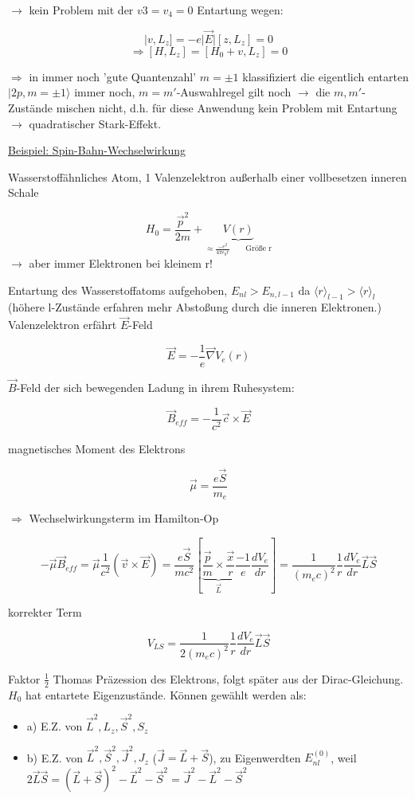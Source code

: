 \(\rightarrow\) kein Problem mit der \(v3=v_4=0\) Entartung wegen:

\[ |v,L_z] = -e|\vec E| [z,L_z] = 0\]
\[\Rightarrow [H,L_z] = [H_0+v,L_z]=0\]

\(\Rightarrow\) in immer noch 'gute Quantenzahl' \(m=\pm 1\) klassifiziert die eigentlich entarten \(|2p,m=\pm 1\rangle\) immer noch, \(m=m'\)-Auswahlregel gilt noch \(\rightarrow\) die \(m,m'\)-Zustände mischen nicht, d.h. für diese Anwendung kein Problem mit Entartung \(\rightarrow\) quadratischer Stark-Effekt.

\underline{Beispiel: Spin-Bahn-Wechselwirkung}

Wasserstoffähnliches Atom, 1 Valenzelektron außerhalb einer vollbesetzen inneren Schale

\[ H_0= \frac{\vec p^2}{2m} + \underbrace{V(r)}_{\approx \frac{-e^2}{4\pi \epsilon_0 r}\qquad\text{Größe r}}\]
\(\rightarrow\) aber immer Elektronen bei kleinem r!

Entartung des Wasserstoffatoms aufgehoben, \(E_{nl}>E_{n,l-1}\) da \(\langle r \rangle_{l-1}> \langle r \rangle_l\) (höhere l-Zustände erfahren mehr Abstoßung durch die inneren Elektronen.) Valenzelektron erfährt \(\vec E\)-Feld

\[ \vec E = -\frac{1}{e}\vec \nabla V_e(r)\]

\(\vec B\)-Feld der sich bewegenden Ladung in ihrem Ruhesystem:

\[ \vec B_{eff} = -\frac{1}{c^2}\vec c\times \vec E\]

magnetisches Moment des Elektrons

\[ \vec\mu = \frac{e \vec S}{m_e}\]

\(\Rightarrow\) Wechselwirkungsterm im Hamilton-Op

\[ -\vec \mu \vec B_{eff} = \vec \mu \frac{1}{c^2}(\vec v \times \vec E) = \frac{e\vec S}{m c^2}\left[\underbrace{ \frac{\vec p}{m}\times \frac{\vec x}{r}}_{\vec L}\frac{-1}{e}\frac{dV_e}{dr} \right]=\frac{1}{(m_ec)^2}\frac{1}{r}\frac{dV_e}{dr}\vec L \vec S\]

korrekter Term

\[ V_{LS}=\frac{1}{2(m_ec)^2}\frac{1}{r}\frac{dV_e}{dr}\vec L \vec S\]

Faktor \(\frac{1}{2}\) Thomas Präzession des Elektrons, folgt später aus der Dirac-Gleichung. \(H_0\) hat entartete Eigenzustände. Können gewählt werden als:
\begin{itemize}
\item a) E.Z. von \(\vec L^2,L_z,\vec S^2,S_z\)
\item b) E.Z. von \(\vec L^2,\vec S^2,\vec J^2,J_z\) (\(\vec J = \vec L + \vec S\)), zu Eigenwerdten \(E^{(0)}_{nl}\), weil \(2\vec L\vec S = (\vec L + \vec S)^2-\vec L^2-\vec S^2 = \vec J^2 - \vec L^2 - \vec S^2\)
\end{itemize}

